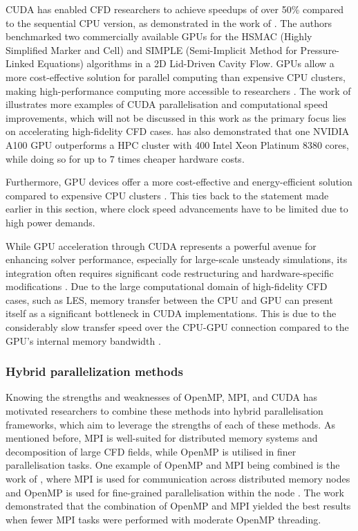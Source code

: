  CUDA has enabled CFD researchers to achieve speedups of over 50\% compared to the sequential CPU version, as demonstrated in the work of \textcite{Lai2020}. The authors benchmarked two commercially available GPUs for the HSMAC (Highly Simplified Marker and Cell) and SIMPLE (Semi-Implicit Method for Pressure-Linked Equations) algorithms in a 2D Lid-Driven Cavity Flow. GPUs allow a more cost-effective solution for parallel computing than expensive CPU clusters, making high-performance computing more accessible to researchers \cite{Chen2009}. The work of \textcite{Afzal2017} illustrates more examples of CUDA parallelisation and computational speed improvements, which will not be discussed in this work as the primary focus lies on accelerating high-fidelity CFD cases. \textcite{ansys2023multiGPU} has also demonstrated that one NVIDIA A100 GPU outperforms a HPC cluster with 400 Intel Xeon Platinum 8380 cores, while doing so for up to 7 times cheaper hardware costs. 

 Furthermore, GPU devices offer a more cost-effective and energy-efficient solution compared to expensive CPU clusters \cite{Afzal2017}. This ties back to the statement made earlier in this section, where clock speed advancements have to be limited due to high power demands.  

While GPU acceleration through CUDA represents a powerful avenue for enhancing solver performance, especially for large-scale unsteady simulations, its integration often requires significant code restructuring and hardware-specific modifications \cite{Afzal2017}. Due to the large computational domain of high-fidelity CFD cases, such as LES, memory transfer between the CPU and GPU can present itself as a significant bottleneck in CUDA implementations. This is due to the considerably slow transfer speed over the CPU-GPU connection compared to the GPU's internal memory bandwidth \cite{Xiang2017, Afzal2017}. 

\subsubsection{Hybrid parallelization methods}
Knowing the strengths and weaknesses of OpenMP, MPI, and CUDA has motivated researchers to combine these methods into hybrid parallelisation frameworks, which aim to leverage the strengths of each of these methods. As mentioned before, MPI is well-suited for distributed memory systems and decomposition of large CFD fields, while OpenMP is utilised in finer parallelisation tasks. One example of OpenMP and MPI being combined is the work of \textcite{Jin2011}, where MPI is used for communication across distributed memory nodes and OpenMP is used for fine-grained parallelisation within the node \cite{Jin2011}. The work demonstrated that the combination of OpenMP and MPI yielded the best results when fewer MPI tasks were performed with moderate OpenMP threading. 

